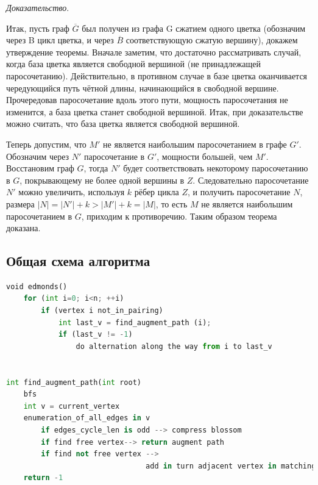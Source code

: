 \documentclass[14pt, a4paper]{extarticle}
\begin{document}
    \textit{Доказательство}. 
    
    Итак, пусть граф $\overline G$ был получен из графа G сжатием одного цветка (обозначим через B цикл цветка, и через $\overline B$ соответствующую сжатую вершину), докажем утверждение теоремы. Вначале заметим, что достаточно рассматривать случай, когда база цветка является свободной вершиной (не принадлежащей паросочетанию). Действительно, в противном случае в базе цветка оканчивается чередующийся путь чётной длины, начинающийся в свободной вершине. Прочередовав паросочетание вдоль этого пути, мощность паросочетания не изменится, а база цветка станет свободной вершиной. Итак, при доказательстве можно считать, что база цветка является свободной вершиной.
    
    Теперь допустим, что $M′$ не является наибольшим паросочетанием в графе $G′$. Обозначим через $N′$ паросочетание в $G′$, мощности большей, чем $M′$. Восстановим граф $G$, тогда $N′$ будет соответствовать некоторому паросочетанию в $G$, покрывающему не более одной вершины в $Z$. Следовательно паросочетание $N′$ можно увеличить, используя $k$ рёбер цикла $Z$, и получить паросочетание $N$, размера $|N|=|N′|+k>|M′|+k=|M|$, то есть $M$ не является наибольшим паросочетанием в $G$, приходим к противоречию. Таким образом теорема доказана.

    \pagebreak
    
    \subsection*{Общая схема алгоритма}

    \begin{lstlisting}[language=Python, basicstyle=\footnotesize\ttfamily, frame=single]
void edmonds() 
    for (int i=0; i<n; ++i) 
        if (vertex i not_in_pairing) 
            int last_v = find_augment_path (i);
            if (last_v != -1) 
                do alternation along the way from i to last_v

                
int find_augment_path(int root) 
    bfs
    int v = current_vertex
    enumeration_of_all_edges in v
        if edges_cycle_len is odd --> compress blossom
        if find free vertex--> return augment path
        if find not free vertex -->
                                add in turn adjacent vertex in matching
    return -1
    \end{lstlisting}

    \pagebreak
    
\end{document}
